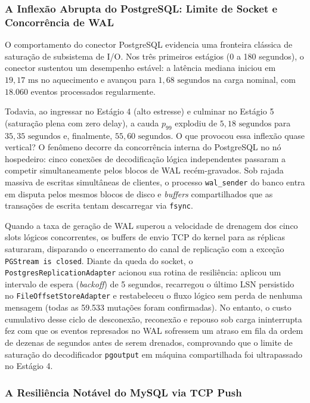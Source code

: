 \documentclass[12pt]{article}
\begin{document}
\subsubsection{A Inflexão Abrupta do PostgreSQL: Limite de Socket e Concorrência de WAL}

O comportamento do conector PostgreSQL evidencia uma fronteira clássica de saturação de subsistema de I/O. Nos três primeiros estágios (0 a 180 segundos), o conector sustentou um desempenho estável: a latência mediana iniciou em $19,17\text{ ms}$ no aquecimento e avançou para $1,68\text{ segundos}$ na carga nominal, com $18.060$ eventos processados regularmente. 

Todavia, ao ingressar no Estágio 4 (alto estresse) e culminar no Estágio 5 (saturação plena com zero delay), a cauda $p_{99}$ explodiu de $5,18\text{ segundos}$ para $35,35\text{ segundos}$ e, finalmente, $55,60\text{ segundos}$. O que provocou essa inflexão quase vertical? 
O fenômeno decorre da concorrência interna do PostgreSQL no nó hospedeiro: cinco conexões de decodificação lógica independentes passaram a competir simultaneamente pelos blocos de WAL recém-gravados. Sob rajada massiva de escritas simultâneas de clientes, o processo \texttt{wal\_sender} do banco entra em disputa pelos mesmos blocos de disco e \textit{buffers} compartilhados que as transações de escrita tentam descarregar via \texttt{fsync}. 

Quando a taxa de geração de WAL superou a velocidade de drenagem dos cinco slots lógicos concorrentes, os buffers de envio TCP do kernel para as réplicas saturaram, disparando o encerramento do canal de replicação com a exceção \texttt{PGStream is closed}. Diante da queda do socket, o \texttt{PostgresReplicationAdapter} acionou sua rotina de resiliência: aplicou um intervalo de espera (\textit{backoff}) de 5 segundos, recarregou o último LSN persistido no \texttt{FileOffsetStoreAdapter} e restabeleceu o fluxo lógico sem perda de nenhuma mensagem (todas as 59.533 mutações foram confirmadas). No entanto, o custo cumulativo desse ciclo de desconexão, reconexão e repouso sob carga ininterrupta fez com que os eventos represados no WAL sofressem um atraso em fila da ordem de dezenas de segundos antes de serem drenados, comprovando que o limite de saturação do decodificador \texttt{pgoutput} em máquina compartilhada foi ultrapassado no Estágio 4.

\subsubsection{A Resiliência Notável do MySQL via TCP Push}
\end{document}
